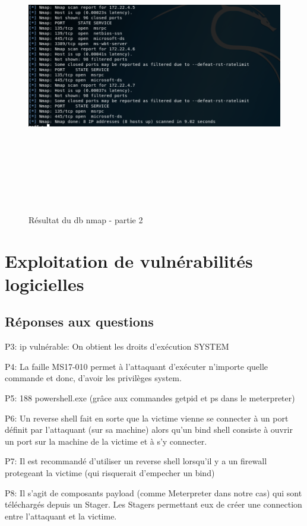 \documentclass[12pt]{report} %
\begin{document}
\begin{figure}
	\newpage
	\includegraphics[width=17cm, height=13cm]{db_nmap_3_1_b.PNG}
	\caption*{Résultat du db nmap - partie 2}
\end{figure}

\newpage

\section*{Exploitation de vulnérabilités logicielles}

\subsection*{Réponses aux questions}
\par P3: ip vulnérable: On obtient les droits d'exécution SYSTEM
\par P4: La faille MS17-010 permet à l'attaquant d'exécuter n'importe quelle commande et donc, d'avoir les privilèges system.
\par P5: 188 powershell.exe (grâce aux commandes getpid et ps dans le meterpreter)
\par P6: Un reverse shell fait en sorte que la victime vienne se connecter à un port définit par l'attaquant (sur sa machine) alors qu'un bind shell consiste à ouvrir un port sur la machine de la victime et à s'y connecter.
\par P7: Il est recommandé d'utiliser un reverse shell lorsqu'il y a un firewall protegeant la victime (qui risquerait d'empecher un bind)
\par P8: Il s'agit de composants payload (comme Meterpreter dans notre cas) qui sont téléchargés depuis un Stager.
Les Stagers permettant eux de créer une connection entre l'attaquant et la victime.
\end{document}
